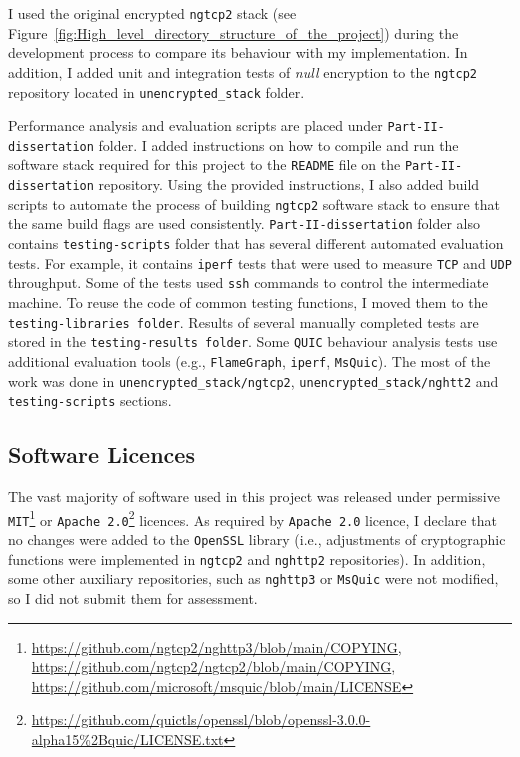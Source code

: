 \documentclass[12pt,a4paper]{report}
\begin{document}
I used the original encrypted \texttt{ngtcp2} stack (see Figure~\ref{fig:High_level_directory_structure_of_the_project}) during the development process to compare its behaviour with my implementation.
In addition, I added unit and integration tests of \textit{null} encryption to the \texttt{ngtcp2} repository located in \texttt{unencrypted\_stack} folder. 






Performance analysis and evaluation scripts are placed under \texttt{Part-II-dissertation} folder.
I added instructions on how to compile and run the software stack required for this project to the \texttt{README} file on the \texttt{Part-II-dissertation} repository.
Using the provided instructions, I also added build scripts to automate the process of building \texttt{ngtcp2} software stack to ensure that the same build flags are used consistently.
\texttt{Part-II-dissertation} folder also contains \texttt{testing-scripts} folder that has several different automated evaluation tests.
For example, it contains \texttt{iperf} tests that were used to measure \texttt{TCP} and \texttt{UDP} throughput.
Some of the tests used \texttt{ssh} commands to control the intermediate machine.
To reuse the code of common testing functions, I moved them to the \texttt{testing-libraries folder}.
Results of several manually completed tests are stored in the \texttt{testing-results folder}.
Some \texttt{QUIC} behaviour analysis tests use additional evaluation tools (e.g., \texttt{FlameGraph}, \texttt{iperf}, \texttt{MsQuic}).
The most of the work was done in \texttt{unencrypted\_stack/ngtcp2}, \texttt{unencrypted\_stack/nghtt2} and \texttt{testing-scripts} sections.







\subsection{Software Licences} 
The vast majority of software used in this project was released under permissive \texttt{MIT}\footnote{\url{https://github.com/ngtcp2/nghttp3/blob/main/COPYING}, \\  \url{https://github.com/ngtcp2/ngtcp2/blob/main/COPYING}, \\
\url{https://github.com/microsoft/msquic/blob/main/LICENSE}} or \texttt{Apache 2.0}\footnote{\url{https://github.com/quictls/openssl/blob/openssl-3.0.0-alpha15\%2Bquic/LICENSE.txt}} licences.
As required by \texttt{Apache 2.0} licence, I declare that no changes were added to the \texttt{OpenSSL} library (i.e., adjustments of cryptographic functions were implemented in \texttt{ngtcp2} and \texttt{nghttp2} repositories).
In addition, some other auxiliary repositories, such as \texttt{nghttp3} or \texttt{MsQuic} were not modified, so I did not submit them for assessment.
\end{document}

